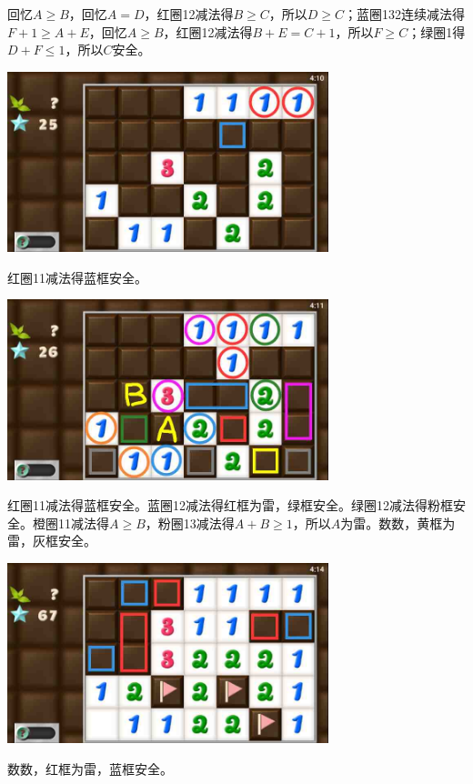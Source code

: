 回忆$A\ge B$，回忆$A=D$，红圈12减法得$B\ge C$，所以$D\ge C$；蓝圈132连续减法得$F+1\ge A+E$，回忆$A\ge B$，红圈12减法得$B+E=C+1$，所以$F\ge C$；绿圈1得$D+F\le 1$，所以$C$安全。
\begin{center}
    \includegraphics[width=0.7\textwidth]{puzzlelow/234-3.jpg}
\end{center}
红圈11减法得蓝框安全。
\begin{center}
    \includegraphics[width=0.7\textwidth]{puzzlelow/234-4.jpg}
\end{center}
红圈11减法得蓝框安全。蓝圈12减法得红框为雷，绿框安全。绿圈12减法得粉框安全。橙圈11减法得$A\ge B$，粉圈13减法得$A+B\ge 1$，所以$A$为雷。数数，黄框为雷，灰框安全。
\begin{center}
    \includegraphics[width=0.7\textwidth]{puzzlelow/234-5.jpg}
\end{center}
数数，红框为雷，蓝框安全。

